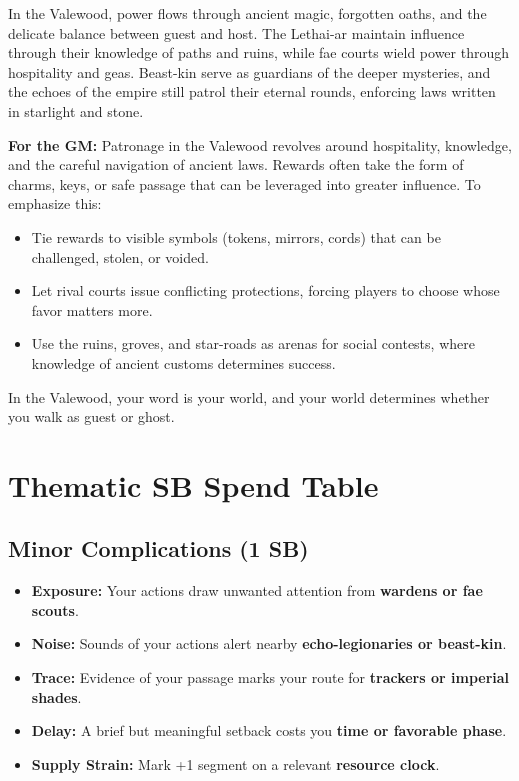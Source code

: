 \begin{tcolorbox}[colback=black!3,colframe=black!40!white,title={Patronage \& Power}]
In the Valewood, power flows through ancient magic, forgotten oaths, and the delicate balance between guest and host. The Lethai-ar maintain influence through their knowledge of paths and ruins, while fae courts wield power through hospitality and geas. Beast-kin serve as guardians of the deeper mysteries, and the echoes of the empire still patrol their eternal rounds, enforcing laws written in starlight and stone.

\textbf{For the GM:}  
Patronage in the Valewood revolves around hospitality, knowledge, and the careful navigation of ancient laws. Rewards often take the form of charms, keys, or safe passage that can be leveraged into greater influence. To emphasize this:
\begin{itemize}
\item Tie rewards to visible symbols (tokens, mirrors, cords) that can be challenged, stolen, or voided.
\item Let rival courts issue conflicting protections, forcing players to choose whose favor matters more.
\item Use the ruins, groves, and star-roads as arenas for social contests, where knowledge of ancient customs determines success.
\end{itemize}
In the Valewood, your word is your world, and your world determines whether you walk as guest or ghost.
\end{tcolorbox}

\section*{Thematic SB Spend Table}
\label{sec:valewood-sb}

\subsection*{Minor Complications (1 SB)}
\begin{itemize}
\item \textbf{Exposure:} Your actions draw unwanted attention from \textbf{wardens or fae scouts}.
\item \textbf{Noise:} Sounds of your actions alert nearby \textbf{echo-legionaries or beast-kin}.
\item \textbf{Trace:} Evidence of your passage marks your route for \textbf{trackers or imperial shades}.
\item \textbf{Delay:} A brief but meaningful setback costs you \textbf{time or favorable phase}.
\item \textbf{Supply Strain:} Mark +1 segment on a relevant \textbf{resource clock}.
\end{itemize}

